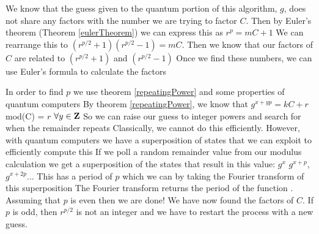 \documentclass[a4paper]{article}
\begin{document}
We know that the guess given to the quantum portion of this algorithm, $g$, does not share any factors with the number we are trying to factor
 $C$. Then by Euler's theorem (Theorem \ref{eulerTheorem}) we can express this as $r^p = mC + 1$
 We can rearrange this to $(r^{p/2} + 1)(r^{p/2} - 1) = mC$. Then we know that our factors of $C$ are related to $(r^{p/2} + 1)$ and $(r^{p/2} - 1)$
 Once we find these numbers, we can use Euler's formula to calculate the factors


In order to find $p$ we use theorem \ref{repeatingPower} and some properties of quantum computers
 By theorem \ref{repeatingPower}, we know that $g^{x + yp} = kC + r$ mod(C) = $r$ $\forall y \in \mathbf{Z}$
 So we can raise our guess to integer powers and search for when the remainder repeats
 Classically, we cannot do this efficiently. However, with quantum computers we have a superposition of states that we can exploit to efficiently compute this
 If we poll a random remainder value from our modulus calculation we get a superposition of the states that result in this value: $g^{x}$
 $g^{x + p}$, $g^{x+2p}$... This has a period of $p$ which we can by taking the Fourier transform of this superposition
 The Fourier transform returns the period of the function \cite{shor}. Assuming that $p$ is even
 then we are done! We have now found the factors of $C$. If $p$ is odd, then $r^{p/2}$ is not an integer
 and we have to restart the process with a new guess. 



\newpage

\nocite{*}




\end{document}
